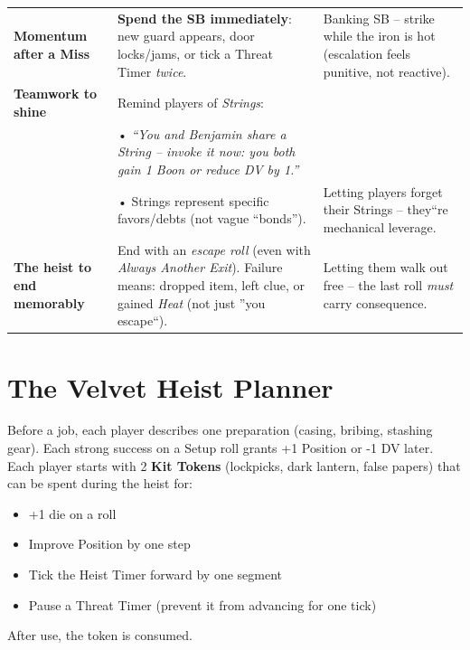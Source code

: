 \documentclass[10pt,twoside]{book}
\begin{document}
\begin{heistengine}
\begin{tabular}{>{\raggedright\arraybackslash}p{} >{\centering\arraybackslash}p{} >{\raggedleft\arraybackslash}p{}}
\textbf{Momentum after a Miss} & \textbf{Spend the SB immediately}: new guard appears, door locks/jams, or tick a Threat Timer \textit{twice}. & Banking SB -- strike while the iron is hot (escalation feels punitive, not reactive). \\
\textbf{Teamwork to shine} & Remind players of \textit{Strings}:\\
& • \textit{``You and Benjamin share a String -- invoke it now: you both gain 1 Boon or reduce DV by 1.''}\\
& • Strings represent specific favors/debts (not vague ``bonds''). & Letting players forget their Strings -- they``re mechanical leverage. \\
\textbf{The heist to end memorably} & End with an \textit{escape roll} (even with \textit{Always Another Exit}). Failure means: dropped item, left clue, or gained \textit{Heat} (not just ''you escape``). & Letting them walk out free -- the last roll \textit{must} carry consequence. \\
\bottomrule
\end{tabular}
\end{heistengine}

\section{The Velvet Heist Planner}
Before a job, each player describes one preparation (casing, bribing, stashing gear). Each strong success on a Setup roll grants +1 Position or -1 DV later. Each player starts with 2 \textbf{Kit Tokens} (lockpicks, dark lantern, false papers) that can be spent during the heist for:
\begin{itemize}
\item +1 die on a roll
\item Improve Position by one step
\item Tick the Heist Timer forward by one segment
\item Pause a Threat Timer (prevent it from advancing for one tick)
\end{itemize}
After use, the token is consumed.
\end{document}
